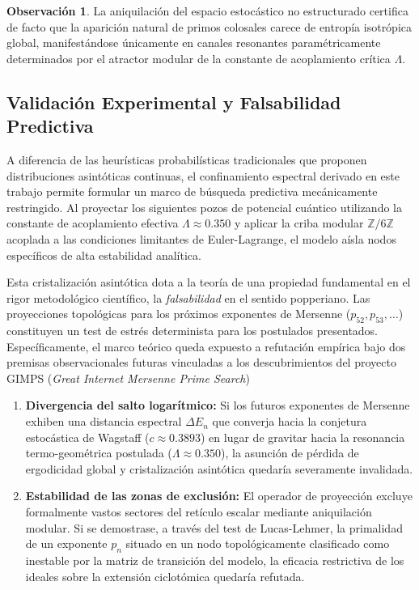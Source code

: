 \documentclass{article}
\numberwithin{equation}{section}
\theoremstyle{plain}
\theoremstyle{definition}
\newtheorem{observacion}[teorema]{Observación}
\begin{document}
\begin{observacion}
La aniquilación del espacio estocástico no estructurado certifica de facto que la aparición natural de primos colosales carece de entropía isotrópica global, manifestándose únicamente en canales resonantes paramétricamente determinados por el atractor modular de la constante de acoplamiento crítica $\Lambda$.
\end{observacion}

\subsection{Validación Experimental y Falsabilidad Predictiva}

A diferencia de las heurísticas probabilísticas tradicionales que proponen distribuciones asintóticas continuas, el confinamiento espectral derivado en este trabajo permite formular un marco de búsqueda predictiva mecánicamente restringido. Al proyectar los siguientes pozos de potencial cuántico utilizando la constante de acoplamiento efectiva $\Lambda \approx 0.350$ y aplicar la criba modular $\mathbb{Z}/6\mathbb{Z}$ acoplada a las condiciones limitantes de Euler-Lagrange, el modelo aísla nodos específicos de alta estabilidad analítica.

Esta cristalización asintótica dota a la teoría de una propiedad fundamental en el rigor metodológico científico, la \textit{falsabilidad} en el sentido popperiano. Las proyecciones topológicas para los próximos exponentes de Mersenne ($p_{52}, p_{53}, \dots$) constituyen un test de estrés determinista para los postulados presentados. Específicamente, el marco teórico queda expuesto a refutación empírica bajo dos premisas observacionales futuras vinculadas a los descubrimientos del proyecto GIMPS (\textit{Great Internet Mersenne Prime Search})
\begin{enumerate}
    \item \textbf{Divergencia del salto logarítmico:} Si los futuros exponentes de Mersenne exhiben una distancia espectral $\Delta E_n$ que converja hacia la conjetura estocástica de Wagstaff ($c \approx 0.3893$) en lugar de gravitar hacia la resonancia termo-geométrica postulada ($\Lambda \approx 0.350$), la asunción de pérdida de ergodicidad global y cristalización asintótica quedaría severamente invalidada.
    \item \textbf{Estabilidad de las zonas de exclusión:} El operador de proyección excluye formalmente vastos sectores del retículo escalar mediante aniquilación modular. Si se demostrase, a través del test de Lucas-Lehmer, la primalidad de un exponente $p_n$ situado en un nodo topológicamente clasificado como inestable por la matriz de transición del modelo, la eficacia restrictiva de los ideales sobre la extensión ciclotómica quedaría refutada.
\end{enumerate}
\end{document}
